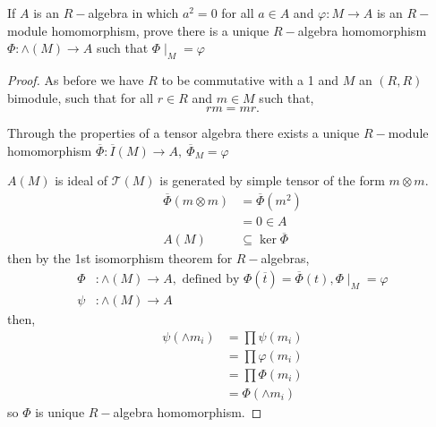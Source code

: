 \documentclass[11pt]{article}
\newenvironment{problem}[2][Problem\!]{\begin{tcolorbox}\begin{trivlist}
\item[\hskip \labelsep {\bfseries #1}\hskip \labelsep {\bfseries #2}]}{\end{trivlist}\end{tcolorbox}}
\renewcommand{\phi}{\varphi}
\begin{document}
\vspace*{15pt}

\begin{problem} {11.5.6}
    If $A$ is an $R-$algebra in which $a^{2} = 0$ for all $a \in A$ and $\phi:M\to A$ is an $R-$module homomorphism, prove there is a unique $R-$algebra homomorphism $\Phi:\wedge(M) \to A$ such that $\Phi\mid_M = \phi$
\end{problem}
\begin{proof}
    As before we have $R$ to be commutative with a 1 and $M$ an $(R,R)$ bimodule, such that for all $r\in R$ and $m \in M$ such that,
    \[rm = mr.\]

    Through the properties of a tensor algebra there exists a unique $R-$module homomorphism $\overline{\Phi}:\overline{I}(M)\to A, \ \overline{\Phi}_M = \phi $

    $A(M)$ is ideal of $\mathcal{T}(M)$ is generated by simple tensor of the form $m \otimes m$.
    \begin{align*}
        \overline{\Phi}(m \otimes m) &= \overline{\Phi}(m^{2}) \\
        &= 0 \in A\\
        A(M) &\subseteq \ker \overline{\Phi}
    \end{align*}
    then by the 1st isomorphism theorem for $R-$algebras, 
    \begin{align*}
        \Phi&: \wedge(M) \to A, \text{ defined by } \Phi(\overline{t}) = \overline{\Phi}(t), \Phi\mid_M = \phi \\
        \psi &: \wedge(M) \to A
    \end{align*}
    then,
    \begin{align*}
        \psi(\wedge m_i) &= \prod \psi(m_i) \\
        &= \prod \phi(m_i) \\
        &= \prod \Phi(m_i) \\
        &= \Phi(\wedge m_i)
    \end{align*}
    so $\Phi$ is unique $R-$algebra homomorphism.
\end{proof}

\vspace*{15pt}
\end{document}

